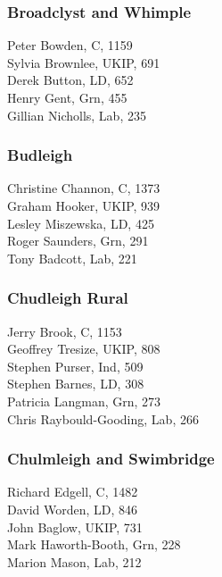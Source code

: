 \documentclass[a4paper,openany,10pt]{book}
\begin{document}
\subsubsection*{Broadclyst and Whimple}



Peter Bowden, C, 1159\\
Sylvia Brownlee, UKIP, 691\\
Derek Button, LD, 652\\
Henry Gent, Grn, 455\\
Gillian Nicholls, Lab, 235\\


\subsubsection*{Budleigh}



Christine Channon, C, 1373\\
Graham Hooker, UKIP, 939\\
Lesley Miszewska, LD, 425\\
Roger Saunders, Grn, 291\\
Tony Badcott, Lab, 221\\


\subsubsection*{Chudleigh Rural}



Jerry Brook, C, 1153\\
Geoffrey Tresize, UKIP, 808\\
Stephen Purser, Ind, 509\\
Stephen Barnes, LD, 308\\
Patricia Langman, Grn, 273\\
{Chris Raybould-Gooding}, Lab, 266\\


\subsubsection*{Chulmleigh and Swimbridge}



Richard Edgell, C, 1482\\
David Worden, LD, 846\\
John Baglow, UKIP, 731\\
Mark Haworth-Booth, Grn, 228\\
Marion Mason, Lab, 212\\
\end{document}
